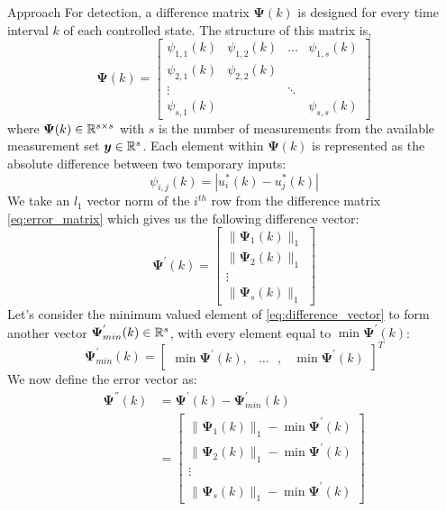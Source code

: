 \begin{section}{Approach}
For detection, a difference matrix $\bm{\Psi}(k)$ is designed for every time interval $k$ of each controlled state. The structure of this matrix is,
    \begin{equation}
    \label{eq:error_matrix}
	\bm{\Psi}(k)=\begin{bmatrix} \psi_{1,1}(k) & \psi_{1,2}(k) & \dots & \psi_{1,s}(k) \\ \psi_{2,1}(k) & \psi_{2,2}(k) &  &  \\ \vdots &  & \ddots &  \\ \psi_{s,1}(k) &  &  & \psi_{s,s}(k) \end{bmatrix}
	\end{equation}
where $\bm{\Psi}(k) \in \mathbb{R}^{s\times s}$ with $s$ is the number of measurements from the available measurement set $\bm{y} \in \mathbb{R}^s$. Each element within $\bm{\Psi}(k)$ is represented as the absolute difference between two temporary inputs:
    \begin{equation}
        \psi_{i,j}(k)=|u^*_i(k)-u^*_j(k)|
    \end{equation}
We take an $l_1$ vector norm of the $i^{th}$ row from the difference matrix \eqref{eq:error_matrix} which gives us the following difference vector:
    \begin{equation}
    \label{eq:difference_vector}
	\bm{\Psi^{'}}(k)=\begin{bmatrix} \lVert{\bm{\Psi}_1(k)}\rVert_1 \\ \lVert{\bm{\Psi}_2(k)}\rVert_1 \\ \vdots \\ \lVert{\bm{\Psi}_s(k)}\rVert_1 \end{bmatrix}
	\end{equation}
Let's consider the minimum valued element of \eqref{eq:difference_vector} to form another vector $\bm{\Psi}^{'}_{min}(k) \in \mathbb{R}^s$, with every element equal to $\min \bm{\Psi}^{'}(k)$:
    \begin{equation}
	\bm{\Psi}^{'}_{min}(k)=\begin{bmatrix} \min \bm{\Psi}^{'}(k),& \dots \text{ },&\min \bm{\Psi}^{'}(k) \end{bmatrix}^T
	\end{equation}
We now define the error vector as:
    \begin{align}
    \label{eq:Psi2}
	\bm{\Psi^{''}}(k)&=\bm{\Psi^{'}}(k)-\bm{\Psi}^{'}_{min}(k) \\
	& =\begin{bmatrix} \lVert{\bm{\Psi}_1(k)}\rVert_1 - \min \bm{\Psi}^{'}(k)\\ \lVert{\bm{\Psi}_2(k)}\rVert_1 - \min \bm{\Psi}^{'}(k) \\ \vdots \\ \lVert{\bm{\Psi}_s(k)}\rVert_1 - \min \bm{\Psi}^{'}(k) \end{bmatrix}
	\end{align}
	

\end{section}
